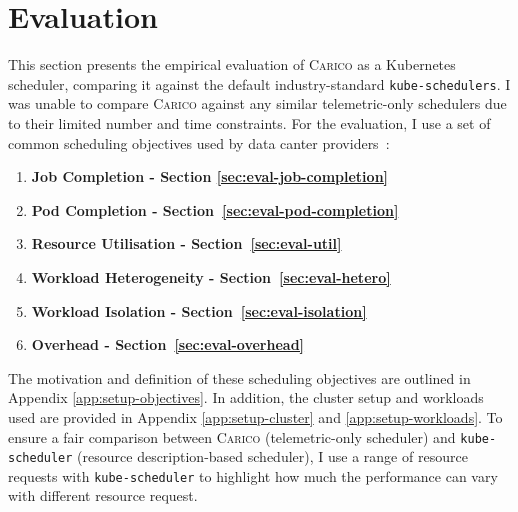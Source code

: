 \chapter{Evaluation}

This section presents the empirical evaluation of \textsc{Carico} as a
Kubernetes scheduler, comparing it against the default industry-standard
\texttt{kube-schedulers}. I was unable to compare \textsc{Carico} against any
similar telemetric-only schedulers due to their limited number and time
constraints. For the evaluation, I use a set of common scheduling objectives
used by data canter providers~\cite{vijayakumar2024scheduling}:
\begin{enumerate}
    \item \textbf{Job Completion - Section \ref{sec:eval-job-completion}}
    \item \textbf{Pod Completion - Section~\ref{sec:eval-pod-completion}}
    \item \textbf{Resource Utilisation - Section~\ref{sec:eval-util}}
    \item \textbf{Workload Heterogeneity - Section~\ref{sec:eval-hetero}}
    \item \textbf{Workload Isolation - Section~\ref{sec:eval-isolation}}
    \item \textbf{Overhead - Section~\ref{sec:eval-overhead}}
\end{enumerate}

The motivation and definition of these scheduling objectives are outlined in
Appendix \ref{app:setup-objectives}. In addition, the cluster setup and
workloads used are provided in Appendix \ref{app:setup-cluster} and
\ref{app:setup-workloads}. To ensure a fair comparison between \textsc{Carico}
(telemetric-only scheduler) and \texttt{kube-scheduler} (resource
description-based scheduler), I use a range of resource requests with
\texttt{kube-scheduler} to highlight how much the performance can vary with
different resource request.


